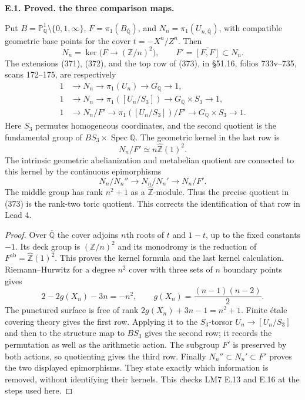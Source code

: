 \documentclass[11pt,oneside]{article}
\makeatletter
\newcounter{statementanchor}
\newenvironment{statement}[3]{%
 \refstepcounter{statementanchor}\def\@currentlabel{#1}%
 \par\addvspace{9pt}\noindent
 \textbf{#1. #2. #3.}\par\nobreak\noindent\ignorespaces
}{\par\addvspace{5pt}}
\makeatother
\begin{document}
\begin{statement}{E.1}{Proved}{the three comparison maps}
\label{st:E.1}
\label{E-three-maps}
Put $B=\mathbb P^1_{\mathbb Q}\setminus\{0,1,\infty\}$,
$F=\pi_1(B_{\overline{\mathbb Q}})$, and
$N_n=\pi_1(U_{n,\overline{\mathbb Q}})$, with compatible
geometric base points for the cover
$t=-X^n/Z^n$. Then
\[
 N_n=\ker\bigl(F\longrightarrow(\mathbb Z/n)^2\bigr),
 \qquad F'=\overline{[F,F]}\subset N_n.
\]
The extensions (371), (372), and the top row of (373), in
\S51.16, folios 733v--735, scans 172--175, are respectively
\begin{align*}
 1&\longrightarrow N_n\longrightarrow\pi_1(U_n)
                 \longrightarrow G_{\mathbb Q}\longrightarrow1,\\
 1&\longrightarrow N_n\longrightarrow\pi_1([U_n/S_3])
                 \longrightarrow G_{\mathbb Q}\times S_3\longrightarrow1,\\
 1&\longrightarrow N_n/F'\longrightarrow\pi_1([U_n/S_3])/F'
                 \longrightarrow G_{\mathbb Q}\times S_3\longrightarrow1.
\end{align*}
Here $S_3$ permutes homogeneous coordinates, and the second
quotient is the fundamental group of $BS_3\times\operatorname{Spec}\mathbb Q$.
The geometric kernel in the last row is
\[
 N_n/F'\simeq n\widehat{\mathbb Z}(1)^2.
\]
The intrinsic geometric abelianization and metabelian quotient
are connected to this kernel by the continuous epimorphisms
\[
 N_n/N_n''\longrightarrow N_n/N_n'\longrightarrow N_n/F'.
\]
The middle group has rank $n^2+1$ as a
$\widehat{\mathbb Z}$-module. Thus the precise quotient in
(373) is the rank-two toric quotient. This corrects the
identification of that row in Lead 4.
\end{statement}
\begin{proof}
Over $\overline{\mathbb Q}$ the cover adjoins $n$th roots of
$t$ and $1-t$, up to the fixed constants $-1$.
Its deck group is $(\mathbb Z/n)^2$ and its monodromy is
the reduction of $F^{\mathrm{ab}}=\widehat{\mathbb Z}(1)^2$.
This proves the kernel formula and the last kernel calculation.
Riemann--Hurwitz for a degree $n^2$ cover with three sets of
$n$ boundary points gives
\[
 2-2g(X_n)-3n=-n^2,\qquad
 g(X_n)=\frac{(n-1)(n-2)}2.
\]
The punctured surface is free of rank
$2g(X_n)+3n-1=n^2+1$. Finite étale covering theory gives
the first row. Applying it to the $S_3$-torsor
$U_n\to[U_n/S_3]$ and then to the structure map to
$BS_3$ gives the second row; it records the permutation
as well as the arithmetic action. The subgroup $F'$
is preserved by both actions, so quotienting gives
the third row. Finally $N_n''\subset N_n'\subset F'$
proves the two displayed epimorphisms. They state
exactly which information is removed, without identifying
their kernels. This checks LM7 E.13 and E.16 at the
steps used here.
\end{proof}
\end{document}
